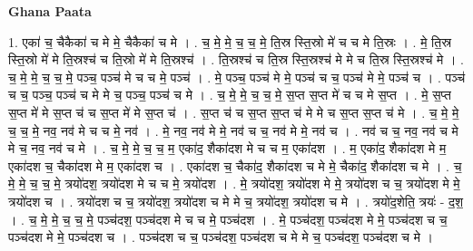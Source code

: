 \documentclass[17pt]{extarticle}
\begin{document}
\textbf{Ghana Paata } \newline

1. एका॑ च॒ चैकैका॑ च मे मे॒ चैकैका॑ च मे । . च॒ मे॒ मे॒ च॒ च॒ मे॒ ति॒स्र स्ति॒स्रो मे॑ च च मे ति॒स्रः । . मे॒ ति॒स्र स्ति॒स्रो मे॑ मे ति॒स्रश्च॑ च ति॒स्रो मे॑ मे ति॒स्रश्च॑ । . ति॒स्रश्च॑ च ति॒स्र स्ति॒स्रश्च॑ मे मे च ति॒स्र स्ति॒स्रश्च॑ मे । . च॒ मे॒ मे॒ च॒ च॒ मे॒ पञ्च॒ पञ्च॑ मे च च मे॒ पञ्च॑ । . मे॒ पञ्च॒ पञ्च॑ मे मे॒ पञ्च॑ च च॒ पञ्च॑ मे मे॒ पञ्च॑ च । . पञ्च॑ च च॒ पञ्च॒ पञ्च॑ च मे मे च॒ पञ्च॒ पञ्च॑ च मे । . च॒ मे॒ मे॒ च॒ च॒ मे॒ स॒प्त स॒प्त मे॑ च च मे स॒प्त । . मे॒ स॒प्त स॒प्त मे॑ मे स॒प्त च॑ च स॒प्त मे॑ मे स॒प्त च॑ । . स॒प्त च॑ च स॒प्त स॒प्त च॑ मे मे च स॒प्त स॒प्त च॑ मे । . च॒ मे॒ मे॒ च॒ च॒ मे॒ नव॒ नव॑ मे च च मे॒ नव॑ । . मे॒ नव॒ नव॑ मे मे॒ नव॑ च च॒ नव॑ मे मे॒ नव॑ च । . नव॑ च च॒ नव॒ नव॑ च मे मे च॒ नव॒ नव॑ च मे । . च॒ मे॒ मे॒ च॒ च॒ म॒ एका॑द॒ शैका॑दश मे च च म॒ एका॑दश । . म॒ एका॑द॒ शैका॑दश मे म॒ एका॑दश च॒ चैका॑दश मे म॒ एका॑दश च । . एका॑दश च॒ चैका॑द॒ शैका॑दश च मे मे॒ चैका॑द॒ शैका॑दश च मे । . च॒ मे॒ मे॒ च॒ च॒ मे॒ त्रयो॑दश॒ त्रयो॑दश मे च च मे॒ त्रयो॑दश । . मे॒ त्रयो॑दश॒ त्रयो॑दश मे मे॒ त्रयो॑दश च च॒ त्रयो॑दश मे मे॒ त्रयो॑दश च । . त्रयो॑दश च च॒ त्रयो॑दश॒ त्रयो॑दश च मे मे च॒ त्रयो॑दश॒ त्रयो॑दश च मे । . त्रयो॑द॒शेति॒ त्रयः॑ - द॒श॒ । . च॒ मे॒ मे॒ च॒ च॒ मे॒ पञ्च॑दश॒ पञ्च॑दश मे च च मे॒ पञ्च॑दश । . मे॒ पञ्च॑दश॒ पञ्च॑दश मे मे॒ पञ्च॑दश च च॒ पञ्च॑दश मे मे॒ पञ्च॑दश च । . पञ्च॑दश च च॒ पञ्च॑दश॒ पञ्च॑दश च मे मे च॒ पञ्च॑दश॒ पञ्च॑दश च मे । \newline
\end{document}
